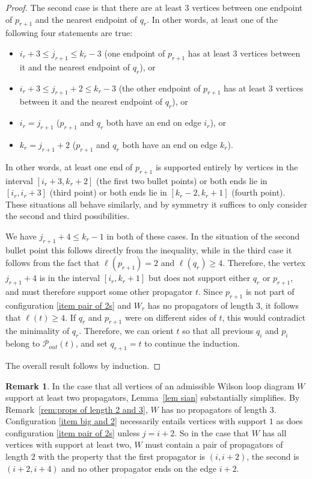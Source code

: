 \documentclass[11pt]{article}
\newcommand{\cP}{\mathcal{P}}
\theoremstyle{remark}
\theoremstyle{definition}
\newtheorem{rmk}[thm]{Remark}
\begin{document}
\begin{proof}
The second case is that there are at least $3$ vertices between one endpoint of $p_{r+1}$ and the nearest endpoint of $q_r$. In other words, at least one of the following four statements are true:
\begin{itemize} 
\item $i_r+3 \leq j_{r+1}\leq k_r-3$ (one endpoint of $p_{r+1}$ has at least 3 vertices between it and the nearest endpoint of $q_r$), or
\item $i_r+3 \leq j_{r+1}+2\leq k_r-3$ (the other endpoint of $p_{r+1}$ has at least 3 vertices between it and the nearest endpoint of $q_r$), or
\item $i_r = j_{r+1}$ ($p_{r+1}$ and $q_r$ both have an end on edge $i_r$), or 
\item $k_r = j_{r+1} +2$  ($p_{r+1}$ and $q_r$ both have an end on edge $k_r$).
\end{itemize}
In other words, at least one end of $p_{r+1}$ is supported entirely by vertices in the interval $[i_r+3,k_r+2]$ (the first two bullet points) or both ends lie in $[i_r, i_r+3]$ (third point) or both ends lie in $[k_r-2, k_r+1]$ (fourth point). These situations all behave similarly, and by symmetry it suffices to only consider the second and third possibilities. 

We have $j_{r+1}+4 \leq k_r-1$ in both of these cases.  In the situation of the second bullet point this follows directly from the inequality, while in the third case it follows from the fact that $\ell(p_{r+1}) = 2$ and $\ell(q_r) \geq 4$. Therefore, the vertex $j_{r+1}+4$ is in the interval $[i_r, k_r+1]$ but does not support either $q_r$ or $p_{r+1}$, and must therefore support some other propagator $t$.  Since $p_{r+1}$ is not part of configuration \ref{item pair of 2s} and $W_r$ has no propagators of length 3, it follows that $\ell(t) \geq 4$.  If $q_r$ and $p_{r+1}$ were on different sides of $t$, this would contradict the minimality of $q_r$.  Therefore, we can orient $t$ so that all previous $q_i$ and $p_i$ belong to $\cP_{out}(t)$, and set $q_{r+1} = t$ to continue the induction.

The overall result follows by induction.
\end{proof}


\begin{rmk}
In the case that all vertices of an admissible Wilson loop diagram $W$ support at least two propagators, Lemma~\ref{lem sian} substantially simplifies.  By Remark~\ref{rem:props of length 2 and 3}, $W$ has no propagators of length $3$.  Configuration \ref{item big and 2} necessarily entails vertices with support $1$ as does configuration \ref{item pair of 2s} unless $j=i+2$.  So in the case that $W$ has all vertices with support at least two, $W$ must contain a pair of propagators of length $2$  with the property that the first propagator is $(i, i+2)$, the second is $(i+2, i+4)$ and no other propagator ends on the edge $i+2$.
\end{rmk}
\end{document}
